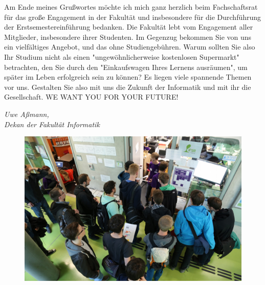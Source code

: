 Am Ende meines Grußwortes möchte ich mich ganz herzlich beim Fachschaftsrat für das große Engagement in der Fakultät und insbesondere für die Durchführung der Erstsemestereinführung bedanken. Die Fakultät lebt vom Engagement aller Mitglieder, insbesondere ihrer Studenten. Im Gegenzug bekommen Sie von uns ein vielfältiges Angebot, und das ohne Studiengebühren. Warum sollten Sie also Ihr Studium nicht als einen "ungewöhnlicherweise kostenlosen Supermarkt" betrachten, den Sie durch den "Einkaufswagen Ihres Lernens ausräumen", um später im Leben erfolgreich sein zu können? Es liegen viele spannende Themen vor uns. Gestalten Sie also mit uns die Zukunft der Informatik und mit ihr die Gesellschaft. WE WANT YOU FOR YOUR FUTURE!


\textit{Uwe Aßmann,\\
Dekan der Fakultät Informatik}

\begin{figure}[b!]
	\centering
	\includegraphics[width=0.9\linewidth]{img/ese2015/bueroansturm.jpg}
\end{figure}%
